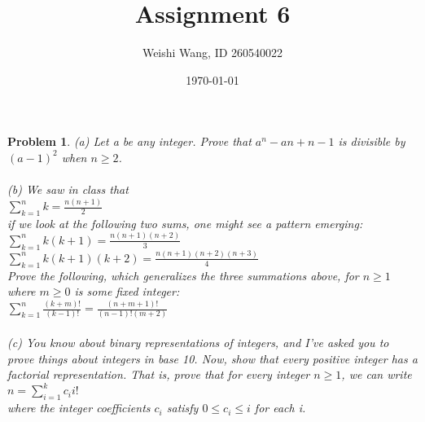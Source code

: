 \documentclass{article}
\newtheorem{problem}{Problem}
\theoremstyle{definition}
\begin{document}
 \title{Assignment 6} 

\author{Weishi Wang, ID 260540022} 

\date{\today}

\maketitle

\begin{problem} 
(a) Let a be any integer. Prove that \(a^n - an + n - 1\) is divisible by \((a-1)^2\) when \(n \ge 2\).\\\\

(b) We saw in class that\\

\(\sum_{k=1}^{n}{k} = \frac{n(n+1)}{2}\)\\

if we look at the following two sums, one might see a pattern emerging:\\

\(\sum_{k=1}^{n}{k(k+1)} = \frac{n(n+1)(n+2)}{3}\)\\

\(\sum_{k=1}^{n}{k(k+1)(k+2)} = \frac{n(n+1)(n+2)(n+3)}{4}\)\\

Prove the following, which generalizes the three summations above, for \(n \ge 1\) where \(m \ge 0\) is some fixed integer:\\

\(\sum_{k=1}^{n}{\frac{(k+m)!}{(k-1)!}} = \frac{(n+m+1)!}{(n-1)!(m+2)}\)\\\\

(c) You know about binary representations of integers, and I've asked you to prove things
about integers in base 10. Now, show that every positive integer has a factorial representation.
That is, prove that for every integer \(n \ge 1\), we can write\\

\(n = \sum_{i=1}^{k}{c_ii!}\)\\

where the integer coefficients \(c_i\) satisfy \(0 \le c_i \le i\) for each i.\\\\\\

\end{problem}
\end{document}
